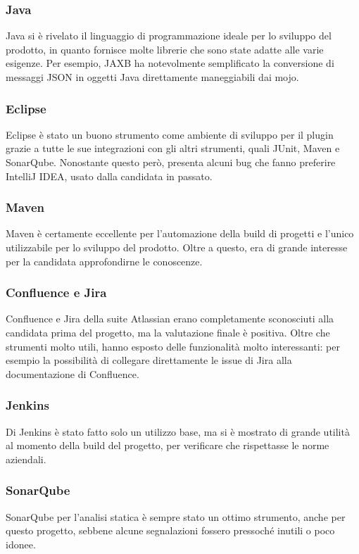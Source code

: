     \subsubsection{Java}
    Java si è rivelato il linguaggio di programmazione ideale per lo sviluppo del prodotto, in quanto fornisce molte librerie che sono state adatte alle varie esigenze.
    Per esempio, JAXB ha notevolmente semplificato la conversione di messaggi JSON in oggetti Java direttamente maneggiabili dai mojo.

    \subsubsection{Eclipse}
    Eclipse è stato un buono strumento come ambiente di sviluppo per il plugin grazie a tutte le sue integrazioni con gli altri strumenti, quali JUnit, Maven e SonarQube.
    Nonostante questo però, presenta alcuni bug che fanno preferire IntelliJ IDEA, usato dalla candidata in passato.

    \subsubsection{Maven}
    Maven è certamente eccellente per l'automazione della build di progetti e l'unico utilizzabile per lo sviluppo del prodotto.
    Oltre a questo, era di grande interesse per la candidata approfondirne le conoscenze.

    \subsubsection{Confluence e Jira}
    Confluence e Jira della suite Atlassian erano completamente sconosciuti alla candidata prima del progetto, ma la valutazione finale è positiva.
    Oltre che strumenti molto utili, hanno esposto delle funzionalità molto interessanti: per esempio la possibilità di collegare direttamente le issue di Jira alla documentazione di Confluence.

    \subsubsection{Jenkins}
    Di Jenkins è stato fatto solo un utilizzo base, ma si è mostrato di grande utilità al momento della build del progetto, per verificare che rispettasse le norme aziendali.

    \subsubsection{SonarQube}
    SonarQube per l'analisi statica è sempre stato un ottimo strumento, anche per questo progetto, sebbene alcune segnalazioni fossero pressoché inutili o poco idonee.

